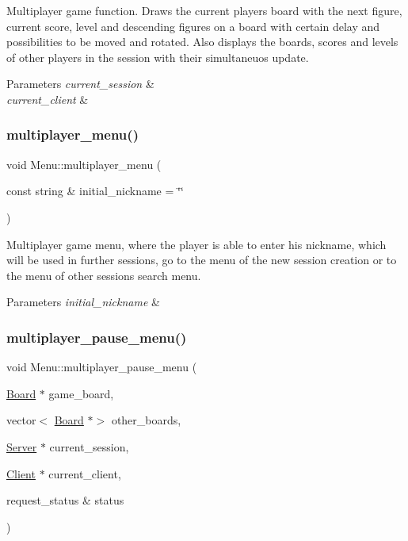Multiplayer game function. Draws the current player\textquotesingle{}s board with the next figure, current score, level and descending figures on a board with certain delay and possibilities to be moved and rotated. Also displays the boards, scores and levels of other players in the session with their simultaneuos update. 


\begin{DoxyParams}{Parameters}
{\em current\+\_\+session} & \\
\hline
{\em current\+\_\+client} & \\
\hline
\end{DoxyParams}
\mbox{\label{classMenu_a04783a738aaaf81187b65879dfb6a693}} 
\subsubsection{\texorpdfstring{multiplayer\+\_\+menu()}{multiplayer\_menu()}}
{\footnotesize\ttfamily void Menu\+::multiplayer\+\_\+menu (\begin{DoxyParamCaption}\item[{const string \&}]{initial\+\_\+nickname = {\ttfamily \char`\"{}\char`\"{}} }\end{DoxyParamCaption})}



Multiplayer game menu, where the player is able to enter his nickname, which will be used in further sessions, go to the menu of the new session creation or to the menu of other sessions search menu. 


\begin{DoxyParams}{Parameters}
{\em initial\+\_\+nickname} & \\
\hline
\end{DoxyParams}
\mbox{\label{classMenu_ab0d97134d6183cf65ee36f6b45171d60}} 
\subsubsection{\texorpdfstring{multiplayer\+\_\+pause\+\_\+menu()}{multiplayer\_pause\_menu()}}
{\footnotesize\ttfamily void Menu\+::multiplayer\+\_\+pause\+\_\+menu (\begin{DoxyParamCaption}\item[{\hyperlink{classBoard}{Board} $\ast$}]{game\+\_\+board,  }\item[{vector$<$ \hyperlink{classBoard}{Board} $\ast$$>$}]{other\+\_\+boards,  }\item[{\hyperlink{classServer}{Server} $\ast$}]{current\+\_\+session,  }\item[{\hyperlink{classClient}{Client} $\ast$}]{current\+\_\+client,  }\item[{request\+\_\+status \&}]{status }\end{DoxyParamCaption})}



